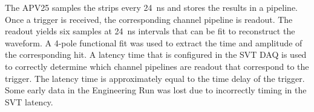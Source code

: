The APV25 samples the strips every 24~ns and stores the results in a pipeline. Once a trigger is received, the corresponding channel pipeline is readout. The readout yields six samples at 24~ns intervals that can be fit to reconstruct the waveform. A 4-pole functional fit was used to extract the time and amplitude of the corresponding hit. A latency time that is configured in the SVT DAQ is used to correctly determine which channel pipelines are readout that correspond to the trigger. The latency time is approximately equal to the time delay of the trigger. Some early data in the Engineering Run was lost due to incorrectly timing in the SVT latency. 
